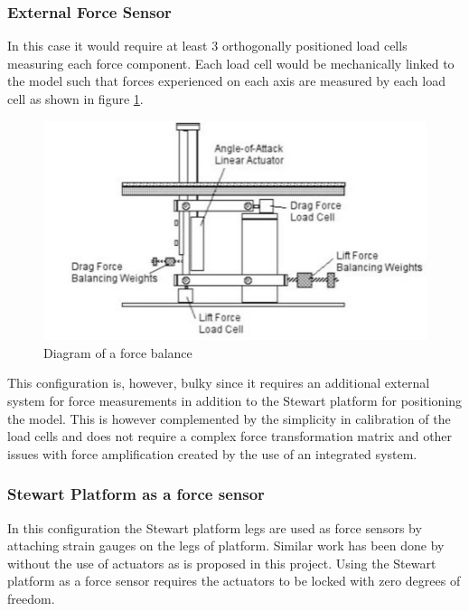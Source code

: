 \subsubsection*{External Force Sensor}
In this case it would require at least 3 orthogonally positioned load cells measuring each force component. Each load cell would be mechanically linked to the model such that forces experienced on each axis are measured by each load cell as shown in figure \ref{fig:balex}. 
\begin{center}
	\begin{figure}[H]
		\centering
		\includegraphics{Figures/modBal}
		\caption[Diagram of a force balance]{Diagram of a force balance \cite{post_force_2010}}
		\label{fig:balex}
	\end{figure}
\end{center}
This configuration is, however, bulky since it requires an additional external system for force measurements in addition to the Stewart platform for positioning the model. This is however complemented by the simplicity in calibration of the load cells and does not require a complex force transformation matrix and other issues with force amplification created by the use of an integrated system.
\subsubsection*{Stewart Platform as a force sensor}
In this configuration the Stewart platform legs are used as force sensors by attaching strain gauges on the legs of platform. Similar work has been done by \cite{ferreira2015design} without the use of actuators as is proposed in this project. Using the Stewart platform as a force sensor requires the actuators to be locked with zero degrees of freedom.

